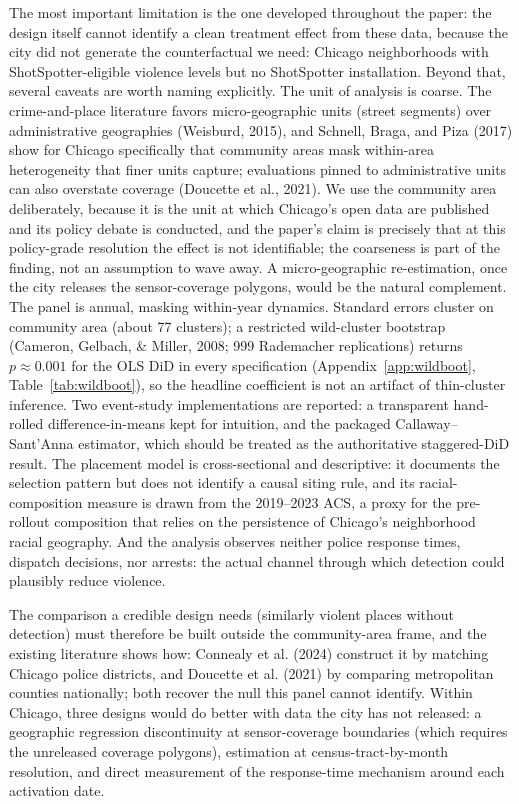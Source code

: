 \documentclass[12pt]{article}
\begin{document}
The most important limitation is the one developed throughout the paper: the design
itself cannot identify a clean treatment effect from these data, because the city did not
generate the counterfactual we need: Chicago neighborhoods with ShotSpotter-eligible
violence levels but no ShotSpotter installation. Beyond that, several caveats are worth
naming explicitly. The unit of analysis is coarse. The crime-and-place literature favors
micro-geographic units (street segments) over administrative geographies (Weisburd, 2015),
and Schnell, Braga, and Piza (2017) show for Chicago specifically that community areas mask
within-area heterogeneity that finer units capture; evaluations pinned to administrative
units can also overstate coverage (Doucette et al., 2021). We use the community area
deliberately, because it is the unit at which Chicago's open data are published and its
policy debate is conducted, and the paper's claim is precisely that at this policy-grade
resolution the effect is not identifiable; the coarseness is part of the finding, not an
assumption to wave away. A micro-geographic re-estimation, once the city releases the
sensor-coverage polygons, would be the natural complement. The panel is annual, masking
within-year dynamics. Standard errors
cluster on community area (about 77 clusters); a restricted wild-cluster bootstrap
(Cameron, Gelbach, \& Miller, 2008; 999 Rademacher replications) returns $p \approx
0.001$ for the OLS DiD in every specification (Appendix~\ref{app:wildboot},
Table~\ref{tab:wildboot}), so the headline coefficient is not an artifact of thin-cluster
inference. Two event-study implementations
are reported: a transparent hand-rolled difference-in-means kept for intuition, and the
packaged Callaway--Sant'Anna estimator, which should be treated as the authoritative
staggered-DiD result. The placement model is cross-sectional and descriptive: it documents
the selection pattern but does not identify a causal siting rule, and its racial-composition
measure is drawn from the 2019--2023 ACS, a proxy for the pre-rollout composition that
relies on the persistence of Chicago's neighborhood racial geography. And the analysis
observes neither police response times, dispatch decisions, nor arrests: the actual channel
through which detection could plausibly reduce violence.

The comparison a credible design needs (similarly violent places without detection) must
therefore be built outside the community-area frame, and the existing literature shows how:
Connealy et al. (2024) construct it by matching Chicago police districts, and Doucette et
al. (2021) by comparing metropolitan counties nationally; both recover the null this panel
cannot identify. Within Chicago, three designs would do better with data the city has not
released: a geographic regression discontinuity at sensor-coverage boundaries (which
requires the unreleased coverage polygons), estimation at census-tract-by-month resolution,
and direct measurement of the response-time mechanism around each activation date.
\end{document}
